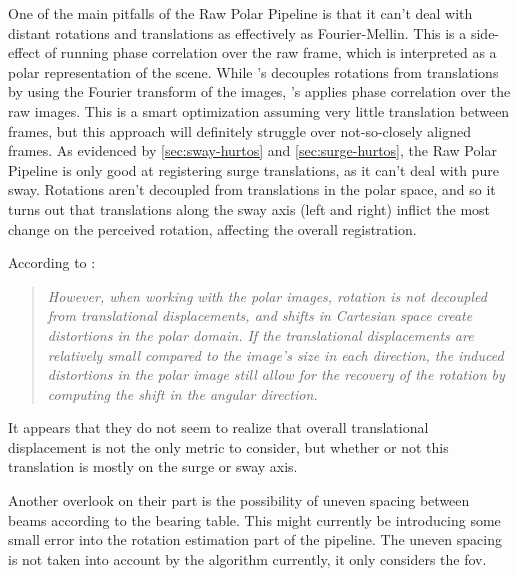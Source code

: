 One of the main pitfalls of the Raw Polar Pipeline is that it can't deal with distant rotations and translations as effectively as Fourier-Mellin. This is a side-effect of running phase correlation over the raw frame, which is interpreted as a polar representation of the scene. While \citeauthor{Reddy1996}'s decouples rotations from translations by using the Fourier transform of the images, \citeauthor{Hurtos2015}'s applies phase correlation over the raw images. This is a smart optimization assuming very little translation between frames, but this approach will definitely struggle over not-so-closely aligned frames. As evidenced by \autoref{sec:sway-hurtos} and \autoref{sec:surge-hurtos}, the Raw Polar Pipeline is only good at registering surge translations, as it can't deal with pure sway. Rotations aren't decoupled from translations in the polar space, and so it turns out that translations along the sway axis (left and right) inflict the most change on the perceived rotation, affecting the overall registration. 

According to \citeauthor{Hurtos2015}\cite{Hurtos2015}:
\begin{quote}
    \textit{However, when working with the polar images, rotation is not decoupled from translational displacements, and shifts in Cartesian space create distortions in the polar domain. If the translational displacements are relatively small compared to the image’s size in each direction, the induced distortions in the polar image still allow for the recovery of the rotation by computing the shift in the angular direction.}
\end{quote}

It appears that they do not seem to realize that overall translational displacement is not the only metric to consider, but whether or not this translation is mostly on the surge or sway axis.

Another overlook on their part is the possibility of uneven spacing between beams according to the bearing table. This might currently be introducing some small error into the rotation estimation part of the pipeline. The uneven spacing is not taken into account by the algorithm currently, it only considers the \acrshort{fov}. 

